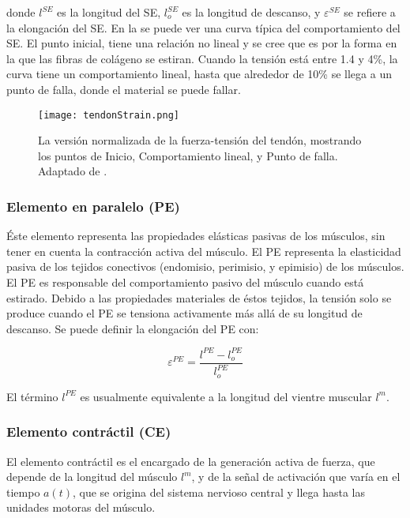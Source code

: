 donde $l^{SE}$ es la longitud del SE, $l_o^{SE}$ es la longitud de descanso, y $\varepsilon^{SE}$ se refiere a la elongación del SE. En la  se puede ver una curva típica del comportamiento del SE.  El punto inicial, tiene una relación no lineal y se cree que es por la forma en la que las fibras de colágeno se estiran. Cuando la tensión está entre 1.4 y 4\%, la curva tiene un comportamiento lineal, hasta que alrededor de 10\% se llega a un punto de falla, donde el material se puede fallar.

\begin{figure}[!ht]
	\centering
		\texttt{[image: tendonStrain.png]}
	\caption[Curva de fuerza-tensión del SE.]{La versión normalizada de la fuerza-tensión del tendón, mostrando los puntos de Inicio, Comportamiento lineal, y Punto de falla. Adaptado de \citep{zajac1989muscle, ng2001anatomically}.}
	\label{fig:tendonStrain}
\end{figure}

\subsubsection{Elemento en paralelo (PE)}

Éste elemento representa las propiedades elásticas pasivas de los músculos, sin tener en cuenta la contracción activa del músculo. El PE representa la elasticidad pasiva de los tejidos conectivos (endomisio, perimisio, y epimisio) de los músculos. El PE es responsable del comportamiento pasivo del músculo cuando está estirado. Debido a las propiedades materiales de éstos tejidos, la tensión solo se produce cuando el PE se tensiona activamente más allá de su longitud de descanso. Se puede definir la elongación del PE con:

\begin{equation}
	\varepsilon^{PE} = \frac{l^{PE}-l_o^{PE}}{l_o^{PE}}
\end{equation}

El término $l^{PE}$ es usualmente equivalente a la longitud del vientre muscular $l^m$. 

\subsubsection{Elemento contráctil (CE)}

El elemento contráctil es el encargado de la generación activa de fuerza, que depende de la longitud del músculo $l^m$, y de la señal de activación que varía en el tiempo $a(t)$, que se origina del sistema nervioso central y llega hasta las unidades motoras del músculo.

